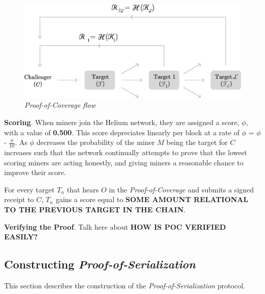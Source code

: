 \documentclass[letterpaper,11pt]{article}
\def\proofofcoverage/{\emph{Proof-of-Coverage}}
\begin{document}
\begin{figure}[H]
	\begin{center}
  		\includegraphics[width=\textwidth]{diagram4.eps}
  		\caption{\emph{\proofofcoverage/ flow}}
  		\label{fig:poc-flow}
 	\end{center}
\end{figure}

\textbf{Scoring}. \label{scores} When miners join the Helium network, they are assigned a score, $\mathit{\phi}$, with a value of \textbf{0.500}. This score depreciates linearly per block at a rate of $\mathit{\phi}$ = $\mathit{\phi}$ - \(\frac{\phi}{10}\). As $\mathit{\phi}$ decreases the probability of the miner $\mathit{M}$ being the target for $\mathit{C}$ increases such that the network continually attempts to prove that the lowest scoring miners are acting honestly, and giving miners a reasonable chance to improve their score.\newline

For every target $\mathit{T_n}$ that hears $\mathit{O}$ in the \proofofcoverage/ and submits a signed receipt to $\mathit{C}$, $\mathit{T_n}$ gains a score equal to \textbf{SOME AMOUNT RELATIONAL TO THE PREVIOUS TARGET IN THE CHAIN}.\newline

\textbf{Verifying the Proof}. Talk here about \textbf{HOW IS POC VERIFIED EASILY?}

\subsection{Constructing \emph{Proof-of-Serialization}}

This section describes the construction of the \emph{Proof-of-Serialization} protocol.\newline
\end{document}
